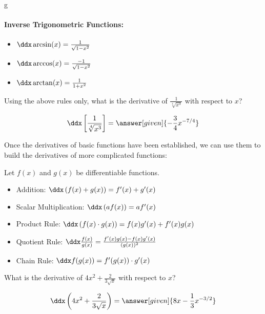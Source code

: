 g\documentclass[nooutcomes]{ximera}
\begin{document}
\begin{theorem}
\paragraph{Inverse Trigonometric Functions:}
\begin{itemize}
\item $\ddx \arcsin(x) = \frac{1}{\sqrt{1-x^2}}$
\item $\ddx \arccos(x) = \frac{-1}{\sqrt{1-x^2}}$
\item $\ddx \arctan(x) =\frac{1}{1+x^2}$
\end{itemize}
\end{theorem}


\begin{question} 
  Using the above rules only, what is the derivative of $\frac{1}{\sqrt[4]{x^3}}$ with respect to $x$?
  \begin{prompt} 
    \[
    \ddx \left[\frac{1}{\sqrt[4]{x^3}}\right] = \answer[given]{- \frac{3}{4} x^{-7/4}}
    \]
  \end{prompt}
\end{question}


Once the derivatives of basic functions have been established, we can use them to build the derivatives of more complicated functions:


\begin{theorem}
  Let $f(x)$ and $g(x)$ be differentiable functions.
\begin{itemize}
\item Addition: $\ddx \left( f(x) + g(x) \right) = f'(x) + g'(x)$
\item Scalar Multiplication: $\ddx \left( af(x) \right) = a f'(x)$
\item Product Rule: $\ddx \left( f(x) \cdot g(x) \right) = f(x)g'(x) + f'(x)g(x)$
\item Quotient Rule: $\ddx \frac{f(x)}{g(x)} = \frac{f'(x)g(x) - f(x)g'(x)}{(g(x))^2}$
\item Chain Rule: $\ddx f(g(x)) = f'(g(x)) \cdot g'(x)$
\end{itemize}
\end{theorem}

\begin{question} 
  What is the derivative of $4x^2 +\frac{2}{3\sqrt{x}} $ with respect to $x$?
  \begin{prompt} 
    \[
    \ddx \left(4x^2 +\frac{2}{3\sqrt{x}} \right) = \answer[given]{8x -\frac{1}{3} x^{-3/2}}
    \]
  \end{prompt}
\end{question}
\end{document}
